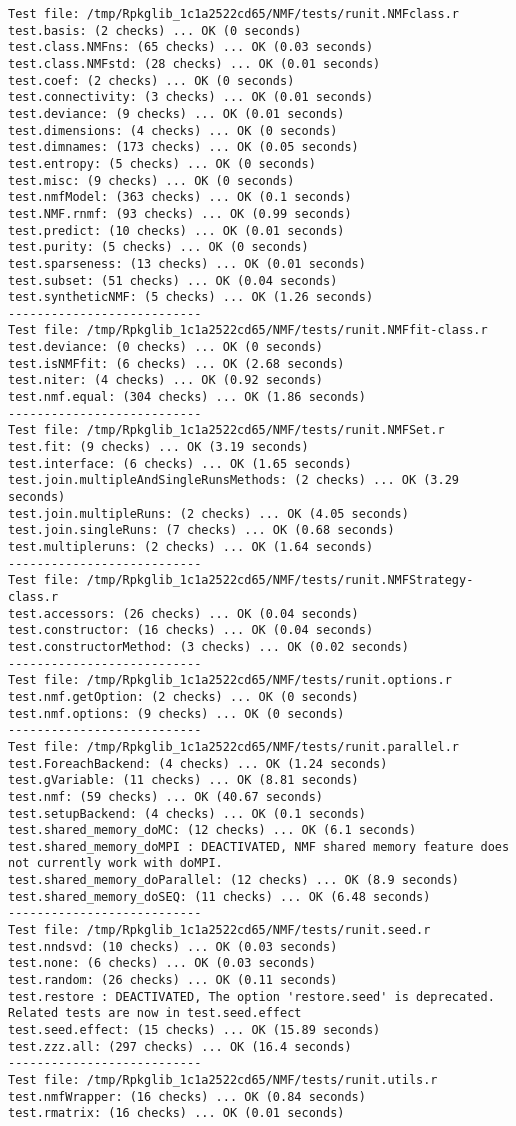 \documentclass[10pt]{article}\usepackage[]{graphicx}\usepackage[]{color}
\begin{document}
\begin{verbatim}
Test file: /tmp/Rpkglib_1c1a2522cd65/NMF/tests/runit.NMFclass.r 
test.basis: (2 checks) ... OK (0 seconds)
test.class.NMFns: (65 checks) ... OK (0.03 seconds)
test.class.NMFstd: (28 checks) ... OK (0.01 seconds)
test.coef: (2 checks) ... OK (0 seconds)
test.connectivity: (3 checks) ... OK (0.01 seconds)
test.deviance: (9 checks) ... OK (0.01 seconds)
test.dimensions: (4 checks) ... OK (0 seconds)
test.dimnames: (173 checks) ... OK (0.05 seconds)
test.entropy: (5 checks) ... OK (0 seconds)
test.misc: (9 checks) ... OK (0 seconds)
test.nmfModel: (363 checks) ... OK (0.1 seconds)
test.NMF.rnmf: (93 checks) ... OK (0.99 seconds)
test.predict: (10 checks) ... OK (0.01 seconds)
test.purity: (5 checks) ... OK (0 seconds)
test.sparseness: (13 checks) ... OK (0.01 seconds)
test.subset: (51 checks) ... OK (0.04 seconds)
test.syntheticNMF: (5 checks) ... OK (1.26 seconds)
--------------------------- 
Test file: /tmp/Rpkglib_1c1a2522cd65/NMF/tests/runit.NMFfit-class.r 
test.deviance: (0 checks) ... OK (0 seconds)
test.isNMFfit: (6 checks) ... OK (2.68 seconds)
test.niter: (4 checks) ... OK (0.92 seconds)
test.nmf.equal: (304 checks) ... OK (1.86 seconds)
--------------------------- 
Test file: /tmp/Rpkglib_1c1a2522cd65/NMF/tests/runit.NMFSet.r 
test.fit: (9 checks) ... OK (3.19 seconds)
test.interface: (6 checks) ... OK (1.65 seconds)
test.join.multipleAndSingleRunsMethods: (2 checks) ... OK (3.29 seconds)
test.join.multipleRuns: (2 checks) ... OK (4.05 seconds)
test.join.singleRuns: (7 checks) ... OK (0.68 seconds)
test.multipleruns: (2 checks) ... OK (1.64 seconds)
--------------------------- 
Test file: /tmp/Rpkglib_1c1a2522cd65/NMF/tests/runit.NMFStrategy-class.r 
test.accessors: (26 checks) ... OK (0.04 seconds)
test.constructor: (16 checks) ... OK (0.04 seconds)
test.constructorMethod: (3 checks) ... OK (0.02 seconds)
--------------------------- 
Test file: /tmp/Rpkglib_1c1a2522cd65/NMF/tests/runit.options.r 
test.nmf.getOption: (2 checks) ... OK (0 seconds)
test.nmf.options: (9 checks) ... OK (0 seconds)
--------------------------- 
Test file: /tmp/Rpkglib_1c1a2522cd65/NMF/tests/runit.parallel.r 
test.ForeachBackend: (4 checks) ... OK (1.24 seconds)
test.gVariable: (11 checks) ... OK (8.81 seconds)
test.nmf: (59 checks) ... OK (40.67 seconds)
test.setupBackend: (4 checks) ... OK (0.1 seconds)
test.shared_memory_doMC: (12 checks) ... OK (6.1 seconds)
test.shared_memory_doMPI : DEACTIVATED, NMF shared memory feature does not currently work with doMPI.
test.shared_memory_doParallel: (12 checks) ... OK (8.9 seconds)
test.shared_memory_doSEQ: (11 checks) ... OK (6.48 seconds)
--------------------------- 
Test file: /tmp/Rpkglib_1c1a2522cd65/NMF/tests/runit.seed.r 
test.nndsvd: (10 checks) ... OK (0.03 seconds)
test.none: (6 checks) ... OK (0.03 seconds)
test.random: (26 checks) ... OK (0.11 seconds)
test.restore : DEACTIVATED, The option 'restore.seed' is deprecated. Related tests are now in test.seed.effect
test.seed.effect: (15 checks) ... OK (15.89 seconds)
test.zzz.all: (297 checks) ... OK (16.4 seconds)
--------------------------- 
Test file: /tmp/Rpkglib_1c1a2522cd65/NMF/tests/runit.utils.r 
test.nmfWrapper: (16 checks) ... OK (0.84 seconds)
test.rmatrix: (16 checks) ... OK (0.01 seconds)


\end{verbatim}
\end{document}
